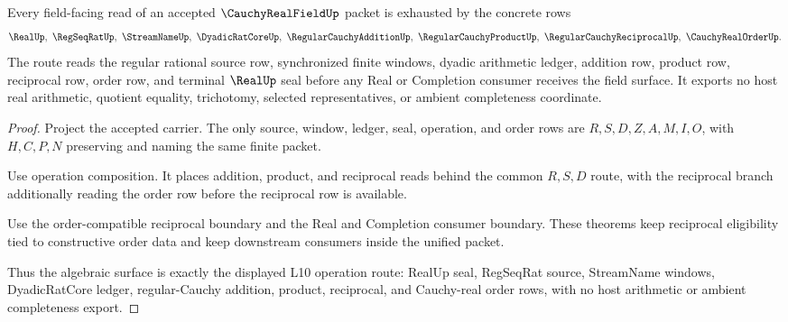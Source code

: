 \begin{theorem}
\label{thm:cauchy-real-field-scoped-operation-route}
Every field-facing read of an accepted $\CauchyRealFieldUp$ packet is exhausted by the concrete rows
$$
\RealUp,\ \RegSeqRatUp,\ \StreamNameUp,\ \DyadicRatCoreUp,\ \RegularCauchyAdditionUp,\ \RegularCauchyProductUp,\ \RegularCauchyReciprocalUp,\ \CauchyRealOrderUp .
$$
The route reads the regular rational source row, synchronized finite windows, dyadic arithmetic ledger, addition row, product row, reciprocal row, order row, and terminal $\RealUp$ seal before any Real or Completion consumer receives the field surface. It exports no host real arithmetic, quotient equality, trichotomy, selected representatives, or ambient completeness coordinate.
\end{theorem}
\begin{proof}
Project the accepted carrier. The only source, window, ledger, seal, operation, and order rows are $R,S,D,Z,A,M,I,O$, with $H,C,P,N$ preserving and naming the same finite packet.

Use operation composition. It places addition, product, and reciprocal reads behind the common $R,S,D$ route, with the reciprocal branch additionally reading the order row before the reciprocal row is available.

Use the order-compatible reciprocal boundary and the Real and Completion consumer boundary. These theorems keep reciprocal eligibility tied to constructive order data and keep downstream consumers inside the unified packet.

Thus the algebraic surface is exactly the displayed L10 operation route: RealUp seal, RegSeqRat source, StreamName windows, DyadicRatCore ledger, regular-Cauchy addition, product, reciprocal, and Cauchy-real order rows, with no host arithmetic or ambient completeness export.
\end{proof}

